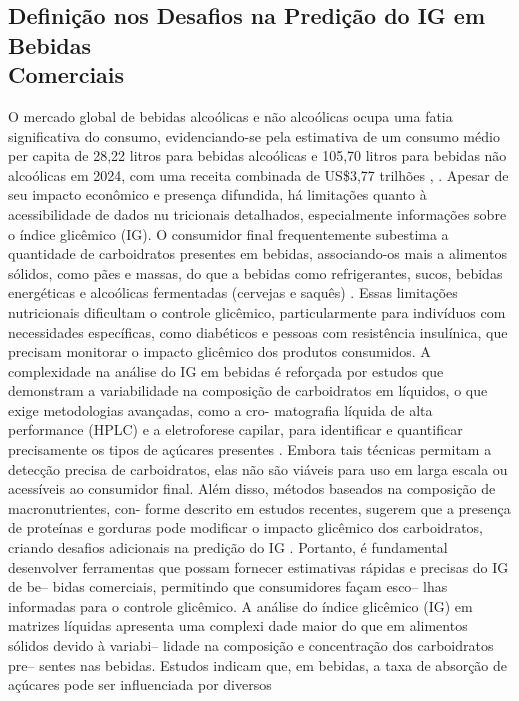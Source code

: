 \documentclass[conference]{IEEEtran}
\begin{document}
\subsection{Definição nos Desafios na Predição do IG em Bebidas \\Comerciais}
\sloppy
O mercado global de bebidas alcoólicas e não alcoólicas 
ocupa uma fatia significativa do consumo, evidenciando-se
pela estimativa de um consumo médio per capita de 28,22 
litros para bebidas alcoólicas e 105,70 litros para bebidas não
alcoólicas em 2024, com uma receita combinada de US\$3,77 trilhões 
\cite{b7}, \cite{b8}. Apesar de seu impacto econômico e presença 
difundida, há limitações quanto à acessibilidade de dados nu
tricionais detalhados, especialmente informações sobre o índice 
glicêmico (IG). O consumidor final frequentemente subestima 
a quantidade de carboidratos presentes em bebidas, 
associando-os mais a alimentos sólidos, como pães e massas, do que 
a bebidas como refrigerantes, sucos, bebidas energéticas e 
alcoólicas fermentadas (cervejas e saquês) \cite{b6}. Essas limitações 
nutricionais dificultam o controle glicêmico, particularmente 
para indivíduos com necessidades específicas, como diabéticos
e pessoas com resistência insulínica, que precisam monitorar o 
impacto glicêmico dos produtos consumidos. A complexidade 
na análise do IG em bebidas é reforçada por estudos que 
demonstram a variabilidade na composição de carboidratos 
em líquidos, o que exige metodologias avançadas, como a cro-
matografia líquida de alta performance (HPLC) e a eletroforese 
capilar, para identificar e quantificar precisamente os tipos 
de açúcares presentes \cite{b29}. Embora tais técnicas permitam a 
detecção precisa de carboidratos, elas não são viáveis para uso 
em larga escala ou acessíveis ao consumidor final. Além disso, 
métodos baseados na composição de macronutrientes, con-
forme descrito em estudos recentes, sugerem que a presença
de proteínas e gorduras pode modificar o impacto glicêmico 
dos carboidratos, criando desafios adicionais na predição do 
IG \cite{b30}. Portanto, é fundamental desenvolver ferramentas que 
possam fornecer estimativas rápidas e precisas do IG de be--
bidas comerciais, permitindo que consumidores façam esco--
lhas informadas para o controle glicêmico. A análise do índice 
glicêmico (IG) em matrizes líquidas apresenta uma complexi
dade maior do que em alimentos sólidos devido à variabi--
lidade na composição e concentração dos carboidratos pre--
sentes nas bebidas. Estudos indicam que, em bebidas, a taxa 
de absorção de açúcares pode ser influenciada por diversos 
\end{document}
